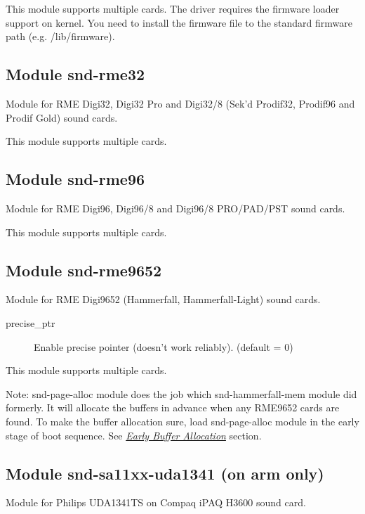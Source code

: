 \documentclass[a4paper,8pt,english]{sphinxmanual}
\begin{document}
This module supports multiple cards.
The driver requires the firmware loader support on kernel.
You need to install the firmware file  to the standard
firmware path (e.g. /lib/firmware).


\subsection{Module snd-rme32}
\label{sound/alsa-configuration:module-snd-rme32}
Module for RME Digi32, Digi32 Pro and Digi32/8 (Sek'd Prodif32,
Prodif96 and Prodif Gold) sound cards.

This module supports multiple cards.


\subsection{Module snd-rme96}
\label{sound/alsa-configuration:module-snd-rme96}
Module for RME Digi96, Digi96/8 and Digi96/8 PRO/PAD/PST sound cards.

This module supports multiple cards.


\subsection{Module snd-rme9652}
\label{sound/alsa-configuration:module-snd-rme9652}
Module for RME Digi9652 (Hammerfall, Hammerfall-Light) sound cards.
\begin{description}
\item[{precise\_ptr}] \leavevmode
Enable precise pointer (doesn't work reliably). (default = 0)

\end{description}

This module supports multiple cards.

Note: snd-page-alloc module does the job which snd-hammerfall-mem
module did formerly.  It will allocate the buffers in advance
when any RME9652 cards are found.  To make the buffer
allocation sure, load snd-page-alloc module in the early
stage of boot sequence.  See {\hyperref[sound/alsa\string-configuration:early\string-buffer\string-allocation]{\emph{Early Buffer Allocation}}}
section.


\subsection{Module snd-sa11xx-uda1341 (on arm only)}
\label{sound/alsa-configuration:module-snd-sa11xx-uda1341-on-arm-only}
Module for Philips UDA1341TS on Compaq iPAQ H3600 sound card.
\end{document}
